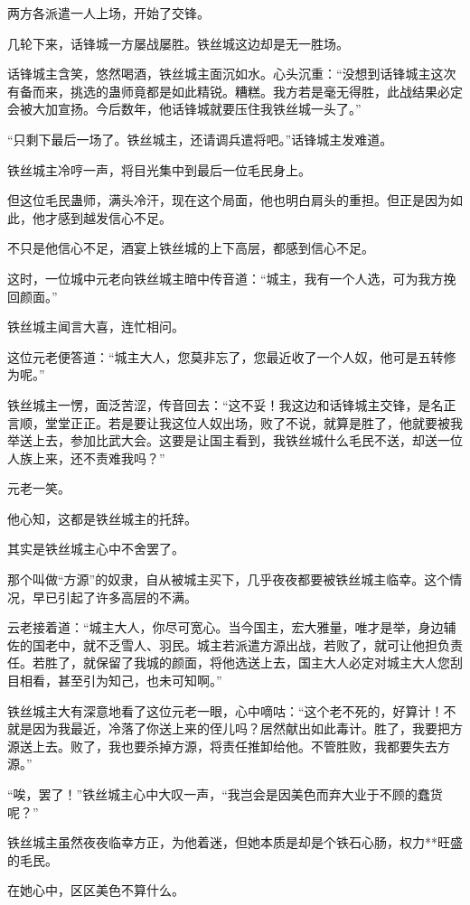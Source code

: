 \begin{this_body}
两方各派遣一人上场，开始了交锋。

几轮下来，话锋城一方屡战屡胜。铁丝城这边却是无一胜场。

话锋城主含笑，悠然喝酒，铁丝城主面沉如水。心头沉重：“没想到话锋城主这次有备而来，挑选的蛊师竟都是如此精锐。糟糕。我方若是毫无得胜，此战结果必定会被大加宣扬。今后数年，他话锋城就要压住我铁丝城一头了。”

“只剩下最后一场了。铁丝城主，还请调兵遣将吧。”话锋城主发难道。

铁丝城主冷哼一声，将目光集中到最后一位毛民身上。

但这位毛民蛊师，满头冷汗，现在这个局面，他也明白肩头的重担。但正是因为如此，他才感到越发信心不足。

不只是他信心不足，酒宴上铁丝城的上下高层，都感到信心不足。

这时，一位城中元老向铁丝城主暗中传音道：“城主，我有一个人选，可为我方挽回颜面。”

铁丝城主闻言大喜，连忙相问。

这位元老便答道：“城主大人，您莫非忘了，您最近收了一个人奴，他可是五转修为呢。”

铁丝城主一愣，面泛苦涩，传音回去：“这不妥！我这边和话锋城主交锋，是名正言顺，堂堂正正。若是要让我这位人奴出场，败了不说，就算是胜了，他就要被我举送上去，参加比武大会。这要是让国主看到，我铁丝城什么毛民不送，却送一位人族上来，还不责难我吗？”

元老一笑。

他心知，这都是铁丝城主的托辞。

其实是铁丝城主心中不舍罢了。

那个叫做“方源”的奴隶，自从被城主买下，几乎夜夜都要被铁丝城主临幸。这个情况，早已引起了许多高层的不满。

云老接着道：“城主大人，你尽可宽心。当今国主，宏大雅量，唯才是举，身边辅佐的国老中，就不乏雪人、羽民。城主若派遣方源出战，若败了，就可让他担负责任。若胜了，就保留了我城的颜面，将他选送上去，国主大人必定对城主大人您刮目相看，甚至引为知己，也未可知啊。”

铁丝城主大有深意地看了这位元老一眼，心中嘀咕：“这个老不死的，好算计！不就是因为我最近，冷落了你送上来的侄儿吗？居然献出如此毒计。胜了，我要把方源送上去。败了，我也要杀掉方源，将责任推卸给他。不管胜败，我都要失去方源。”

“唉，罢了！”铁丝城主心中大叹一声，“我岂会是因美色而弃大业于不顾的蠢货呢？”

铁丝城主虽然夜夜临幸方正，为他着迷，但她本质是却是个铁石心肠，权力**旺盛的毛民。

在她心中，区区美色不算什么。


\end{this_body}
